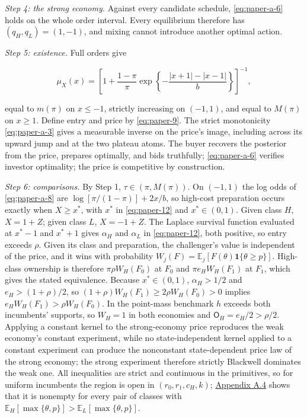 \emph{Step 4: the strong economy.} Against every candidate schedule,
\eqref{eq:paper-a-6} holds on the whole order interval. Every
equilibrium therefore has \((q_H,q_L)=(1,-1)\), and mixing cannot
introduce another optimal action.

\emph{Step 5: existence.} Full orders give

\[
\mu_X(x)=\left[1+\frac{1-\pi}{\pi}
\exp\left\{-\frac{|x+1|-|x-1|}{b}\right\}\right]^{-1},
\tag{A.8}\label{eq:paper-a-8}
\]

equal to \(m(\pi)\) on \(x\le-1\), strictly increasing on \((-1,1)\),
and equal to \(M(\pi)\) on \(x\ge1\). Define entry and price by
\eqref{eq:paper-9}. The strict monotonicity \eqref{eq:paper-a-3} gives a
measurable inverse on the price's image, including across its upward
jump and at the two plateau atoms. The buyer recovers the posterior from
the price, prepares optimally, and bids truthfully;
\eqref{eq:paper-a-6} verifies investor optimality; the price is
competitive by construction.

\emph{Step 6: comparisons.} By Step 1, \(\tau\in(\pi,M(\pi))\). On
\((-1,1)\) the log odds of \eqref{eq:paper-a-8} are
\(\log[\pi/(1-\pi)]+2x/b\), so high-cost preparation occurs exactly when
\(X\ge x^*\), with \(x^*\) in \eqref{eq:paper-12} and
\(x^*\in(0,1)\). Given class \(H\), \(X=1+Z\); given class \(L\),
\(X=-1+Z\). The Laplace survival function evaluated at \(x^*-1\) and
\(x^*+1\) gives \(\alpha_H\) and \(\alpha_L\) in \eqref{eq:paper-12},
both positive, so entry exceeds \(\rho\). Given its class and
preparation, the challenger's value is independent of the price, and it
wins with probability \(W_j(F)=\mathbb E_j[F(\theta)\mathbf1\{\theta\ge
p\}]\). High-class ownership is therefore \(\pi\rho W_H(F_0)\) at
\(F_0\) and \(\pi e_HW_H(F_1)\) at \(F_1\), which gives the stated
equivalence. Because \(x^*\in(0,1)\), \(\alpha_H>1/2\) and
\(e_H>(1+\rho)/2\), so \((1+\rho)W_H(F_1)\ge2\rho W_H(F_0)>0\) implies
\(e_HW_H(F_1)>\rho W_H(F_0)\). In the point-mass benchmark \(h\)
exceeds both incumbents' supports, so \(W_H=1\) in both economies and
\(\mathsf O_H=e_H/2>\rho/2\). Applying a constant kernel to the
strong-economy price reproduces the weak economy's constant experiment,
while no state-independent kernel applied to a constant experiment can
produce the nonconstant state-dependent price law of the strong economy;
the strong experiment therefore strictly Blackwell dominates the weak
one. All inequalities are strict and continuous in the primitives, so
for uniform incumbents the region is open in \((r_0,r_1,c_H,k)\);
\hyperref[pa-calculations]{Appendix A.4} shows that it is nonempty for
every pair of classes with
\(\mathbb E_H[\max\{\theta,p\}]>\mathbb E_L[\max\{\theta,p\}]\).

